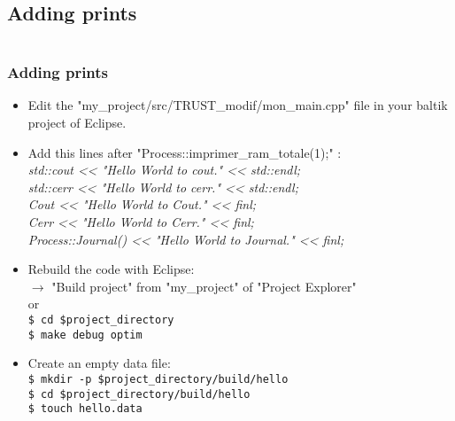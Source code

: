 \documentclass[10pt, hyperref={unicode=true,pdfusetitle, bookmarks=true,bookmarksnumbered=false,bookmarksopen=false, breaklinks=false,pdfborder={0 0 1},backref=true,colorlinks=true,linkcolor=darkblue,pageanchor, urlcolor=darkblue}]{beamer}
\begin{document}
\subsection{{\bf{Adding prints}}}
\begin{frame}
\begin{columns}[c] 
\tableofcontents[sections={1-3},currentsection, currentsubsection]
\tableofcontents[sections={4-8},currentsection, currentsubsection]
\end{columns}
\end{frame}
\begin{frame}
\frametitle{Adding prints}
\begin{block}{}

\begin{itemize}
\item Edit the "my\_project/src/TRUST\_modif/mon\_main.cpp" file in your baltik project of Eclipse.

\item Add this lines after "Process::imprimer\_ram\_totale(1);" :\\
\textit{std::cout <\textcompwordmark{}< "Hello World to cout." <\textcompwordmark{}< std::endl;\\
std::cerr <\textcompwordmark{}< "Hello World to cerr." <\textcompwordmark{}< std::endl;\\
Cout <\textcompwordmark{}< "Hello World to Cout." <\textcompwordmark{}< finl;\\
Cerr <\textcompwordmark{}< "Hello World to Cerr." <\textcompwordmark{}< finl;\\
Process::Journal() <\textcompwordmark{}< "Hello World to Journal." <\textcompwordmark{}< finl;}\\

\item Rebuild the code with Eclipse:\\
$\rightarrow$ "Build project" from "my\_project" of "Project Explorer"\\
or \\
\texttt{\$ cd \$project\_directory}\\
\texttt{\$ make debug optim}\\

\item Create an empty data file:\\
\texttt{\$ mkdir -p \$project\_directory/build/hello}\\
\texttt{\$ cd \$project\_directory/build/hello}\\
\texttt{\$ touch hello.data}\\

\end{itemize}

\end{block}
\end{frame}
\end{document}
